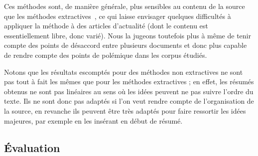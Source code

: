 \documentclass{article}           %
\begin{document}
Ces méthodes sont, de manière générale, plus sensibles au contenu de la source que les méthodes extractives~\cite[p.1774]{jones_automatic_2007}, ce qui laisse envisager quelques difficultés à appliquer la méthode à des articles d'actualité (dont le contenu est essentiellement libre, donc varié). Nous la jugeons toutefois plus à même de tenir compte des points de désaccord entre plusieurs documents et donc plus capable de rendre compte des points de polémique dans les corpus étudiés.

Notons que les résultats escomptés pour des méthodes non extractives ne sont pas tout à fait les mêmes que pour les méthodes extractives ; en effet, les résumés obtenus ne sont pas linéaires au sens où les idées peuvent ne pas suivre l'ordre du texte. Ils ne sont donc pas adaptés si l'on veut rendre compte de l'organisation de la source, en revanche ils peuvent être très adaptés pour faire ressortir les idées majeures, par exemple en les insérant en début de résumé.

\subsection{Évaluation}
\end{document}
